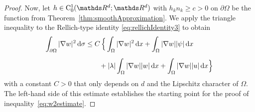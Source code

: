\begin{proof}
  Now, let $h \in \CC_0^1(\R^d; \R^d)$ with $h_k n_k \geq c > 0$ on $\partial \Omega$ be the function from Theorem~\ref{thm:smoothApproximation}.
  We apply the triangle inequality to the Rellich-type identity \eqref{eq:rellichIdentity3} to obtain
  \begin{align}
\label{eq:rellichInequality3}
      \begin{alignedat}{2}
    \int_{\partial\Omega} |\nabla w|^2 \, {\operatorname{d}\!{\sigma}} 
    &\leq C \, \Big\{ \int_\Omega |\nabla w|^2 \, {\operatorname{d}\!{x}} + \int_\Omega |\nabla w | |\psi| \, {\operatorname{d}\!{x}} \\[0.5em]
    &\qquad + |\lambda| \int_\Omega |\nabla w| |w| \, {\operatorname{d}\!{x}} + \int_\Omega |\nabla w| |u| \, {\operatorname{d}\!{x}} \Big\}
\end{alignedat}
  \end{align}
  with a constant $C > 0$ that only depends on $d$ and the Lipschitz character of $\Omega$.
  The left-hand side of this estimate establishes the starting point for the proof of inequality~\eqref{eq:w2estimate}.


\end{proof}
